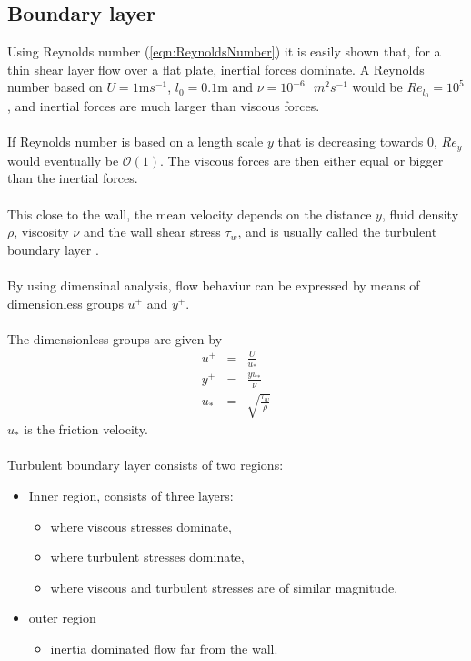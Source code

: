 \documentclass[a4paper, 12pt]{report}
\begin{document}
\subsection{Boundary layer}
Using Reynolds number (\ref{eqn:ReynoldsNumber}) it is easily shown that, for a thin shear layer flow over a flat plate, inertial forces dominate. A Reynolds number based on $U= 1$m$s^{-1}$, $l_0= 0.1$m and $\nu = 10^{-6}\textit{ }m^2s^{-1}$ would be $Re_{l_0} = 10^5$, and inertial forces are much larger than viscous forces.\\
\\
If Reynolds number is based on a length scale $y$ that is decreasing towards $0$, $Re_y$ would eventually be $\mathcal{O}(1)$. The viscous forces are then either equal or bigger than the inertial forces.\\
\\
This close to the wall, the mean velocity depends on the distance $y$, fluid density $\rho$, viscosity $\nu$ and the wall shear stress $\tau_w$, and is usually called the turbulent boundary layer \cite{CFD}.\\
\\
By using dimensinal analysis, flow behaviur can be expressed by means of dimensionless groups $u^+$ and $y^+$.\\
\\
The dimensionless groups are given by \cite{CFD}
\begin{eqnarray}
\label{eqn:upluss}
u^+ &=& \frac{U}{u_*}\\
\label{eqn:ypluss}
y^+ &=& \frac{y u_*}{\nu}\\
\label{eqn:uStar}
u_* &=& \sqrt{\frac{\tau_w}{\rho}} 
\end{eqnarray}
$u_*$ is the friction velocity.\\
\\
Turbulent boundary layer consists of two regions:
\begin{itemize}
\item Inner region, consists of three layers:
	\begin{itemize}
	\item where viscous stresses dominate,
	\item where turbulent stresses dominate,
	\item where viscous and turbulent stresses are of similar magnitude.
	\end{itemize}
\item outer region
	\begin{itemize}
	\item inertia dominated flow far from the wall.
	\end{itemize}
\end{itemize}
\end{document}
